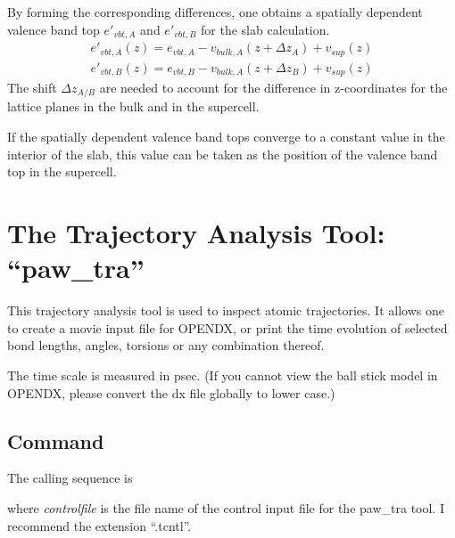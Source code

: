 \documentclass[final,12pt,makeidx,DIV=calc]{article}
\begin{document}
{{{{{{By forming the corresponding differences, one obtains a spatially
dependent valence band top $e'_{vbt,A}$ and $e'_{vbt,B}$ 
for the slab calculation.
\begin{eqnarray*}
e'_{vbt,A}(z)=e_{vbt,A}-v_{bulk,A}(z+\Delta z_A)+v_{sup}(z)
\\
e'_{vbt,B}(z)=e_{vbt,B}-v_{bulk,A}(z+\Delta z_B)+v_{sup}(z)
\end{eqnarray*}
The shift $\Delta z_{A/B}$ are needed to account for the difference in
z-coordinates for the lattice planes in the bulk and in the supercell.

If the spatially dependent valence band tops converge to a constant
value in the interior of the slab, this value can be taken as the
position of the valence band top in the supercell.
 

\newpage
\section{The Trajectory Analysis Tool: ``paw\_tra''}
This trajectory analysis tool is used to inspect atomic trajectories. It
allows one to create a movie input file for OPENDX\cite{opendx}, or print the
time evolution of selected bond lengths, angles, torsions or any combination
thereof.

The time scale is measured in psec. (If you cannot view the ball stick
model in OPENDX\cite{opendx}, please convert the dx file globally to
lower case.)

\subsection{Command}
The calling sequence is

\bigskip{}\bigskip

\noindent
where {\it controlfile} is the file name of the control input file for
the paw\_tra tool. I recommend the extension
``.tcntl''.

}}}}}}
\end{document}

